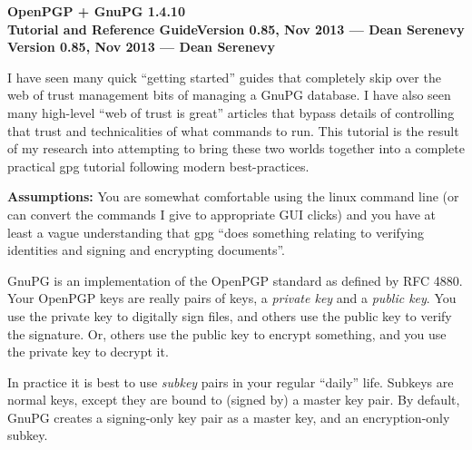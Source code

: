 \documentclass[letterpaper]{article}
\makeatletter
\renewcommand{\title}[2][]{\begin{center}\sffamily\bfseries\Large #2\ifx\relax#1\else\\[1ex]\normalsize #1\fi\end{center}\vspace{1ex}}
\def\section{\@startsection{section}{1}{\z@}{-2ex\@plus-.5ex\@minus-.2ex}{.001ex\@plus0ex\@minus.3ex}{\normalfont\Large\sffamily\bfseries}}
\renewcommand{\_}[1]{\ifmmode_{_{#1}}\else\underline{\phantom{n}}$\,$#1\fi}
\makeatother
\begin{document}
\title[Version 0.85, Nov 2013 --- Dean Serenevy]
{OpenPGP + GnuPG 1.4.10\\
Tutorial and Reference Guide}




\tableofcontents

\section{Overview}

I have seen many quick ``getting started'' guides that completely skip over
the web of trust management bits of managing a GnuPG database. I have also
seen many high-level ``web of trust is great'' articles that bypass details
of controlling that trust and technicalities of what commands to run. This
tutorial is the result of my research into attempting to bring these two
worlds together into a complete practical gpg tutorial following modern
best-practices.

\textbf{Assumptions:} You are somewhat comfortable using the linux command
line (or can convert the commands I give to appropriate GUI clicks) and you
have at least a vague understanding that gpg ``does something relating to
verifying identities and signing and encrypting documents''.


GnuPG is an implementation of the OpenPGP standard as defined by RFC 4880.
Your OpenPGP keys are really pairs of keys, a \textsl{private key} and a
\textsl{public key}. You use the private key to digitally sign files, and
others use the public key to verify the signature. Or, others use the
public key to encrypt something, and you use the private key to decrypt it.

In practice it is best to use \textsl{subkey} pairs in your regular
``daily'' life. Subkeys are normal keys, except they are bound to (signed
by) a master key pair. By default, GnuPG creates a signing-only key pair as
a master key, and an encryption-only subkey.
\end{document}
